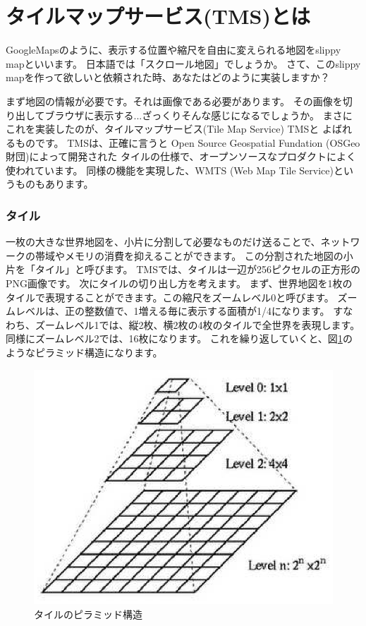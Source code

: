\chapter*{タイルマップサービス(TMS)とは}

GoogleMapsのように、表示する位置や縮尺を自由に変えられる地図をslippy mapといいます。
日本語では「スクロール地図」でしょうか。
さて、このslippy mapを作って欲しいと依頼された時、あなたはどのように実装しますか？

まず地図の情報が必要です。それは画像である必要があります。
その画像を切り出してブラウザに表示する...ざっくりそんな感じになるでしょうか。
まさにこれを実装したのが、タイルマップサービス(Tile Map Service) TMSと
よばれるものです。
%
TMSは、正確に言うと Open Source Geospatial Fundation (OSGeo財団)によって開発された
タイルの仕様で、オープンソースなプロダクトによく使われています。
同様の機能を実現した、WMTS (Web Map Tile Service)というものもあります。

\subsection*{タイル}
一枚の大きな世界地図を、小片に分割して必要なものだけ送ることで、ネットワークの帯域やメモリの消費を抑えることができます。
この分割された地図の小片を「タイル」と呼びます。
TMSでは、タイルは一辺が256ピクセルの正方形のPNG画像です。
次にタイルの切り出し方を考えます。
まず、世界地図を1枚のタイルで表現することができます。この縮尺をズームレベル0と呼びます。
ズームレベルは、正の整数値で、1増える毎に表示する面積が1/4になります。
すなわち、ズームレベル1では、縦2枚、横2枚の4枚のタイルで全世界を表現します。
同様にズームレベル2では、16枚になります。
これを繰り返していくと、図\ref{fig:tile_pylamid}のようなピラミッド構造になります。

\begin{figure}[thbp]
\centering
\includegraphics{Tiling.eps}
\caption{タイルのピラミッド構造\cite{ref:tile}}
\label{fig:tile_pylamid}
\end{figure}

